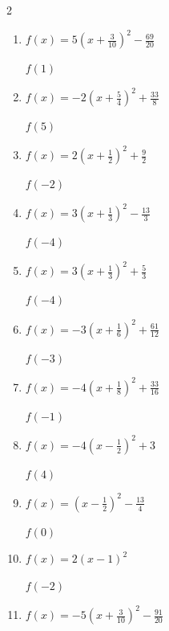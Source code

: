 \begin{multicols}{2}
\begin{enumerate}
$f(-5)$
        \phantom{$=52$}

  \item $\displaystyle f(x)=5\left( x+\frac{3}{10}\right)^{2}-\frac{69}{20}$

$f(1)$
        \phantom{$=5$}

  \item $\displaystyle f(x)=-2\left( x+\frac{5}{4}\right)^{2}+\frac{33}{8}$

$f(5)$
        \phantom{$=-74$}

\columnbreak %

  \item $\displaystyle f(x)=2\left( x+\frac{1}{2}\right)^{2}+\frac{9}{2}$

$f(-2)$
        \phantom{$=9$}

  \item $\displaystyle f(x)=3\left( x+\frac{1}{3}\right)^{2}-\frac{13}{3}$

$f(-4)$
        \phantom{$=36$}

  \item $\displaystyle f(x)=3\left( x+\frac{1}{3}\right)^{2}+\frac{5}{3}$

$f(-4)$
        \phantom{$=42$}

  \item $\displaystyle f(x)=-3\left( x+\frac{1}{6}\right)^{2}+\frac{61}{12}$

$f(-3)$
        \phantom{$=-19$}

  \item $\displaystyle f(x)=-4\left( x+\frac{1}{8}\right)^{2}+\frac{33}{16}$

$f(-1)$
        \phantom{$=-1$}

\columnbreak %

\resetques

  \item $\displaystyle f(x)=-4\left( x-\frac{1}{2}\right)^{2}+3$

$f(4)$
        \phantom{$=-46$}

  \item $\displaystyle f(x)=\left( x-\frac{1}{2}\right)^{2}-\frac{13}{4}$

$f(0)$
        \phantom{$=-3$}

  \item $\displaystyle f(x)=2\left( x-1\right)^{2}$

$f(-2)$
        \phantom{$=18$}

  \item $\displaystyle f(x)=-5\left( x+\frac{3}{10}\right)^{2}-\frac{91}{20}$


\end{enumerate}
\end{multicols}
